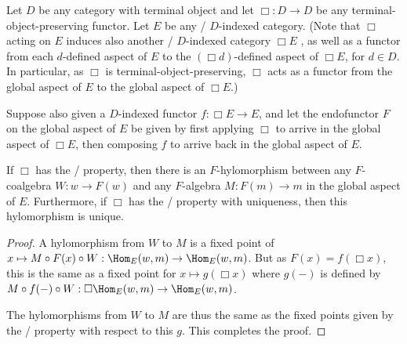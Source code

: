 \begin{theorem}\label{CoalgToAlg}
Let $D$ be any category with terminal object and let $\Box : D \to D$ be any terminal-object-preserving functor. Let $E$ be any \repsmall/ $D$-indexed category. (Note that $\Box$ acting on $E$ induces also another \repsmall/ $D$-indexed category $\Box E$ , as well as a functor from each $d$-defined aspect of $E$ to the $(\Box d)$-defined aspect of $\Box E$, for $d \in D$. In particular, as $\Box$ is terminal-object-preserving, $\Box$ acts as a functor from the global aspect of $E$ to the global aspect of $\Box E$.) 

Suppose also given a $D$-indexed functor $f : \Box E \to E$, and let the endofunctor $F$ on the global aspect of $E$ be given by first applying $\Box$ to arrive in the global aspect of $\Box E$, then composing $f$ to arrive back in the global aspect of $E$.

If $\Box$ has the \Loeb/ property, then there is an $F$-hylomorphism between any $F$-coalgebra $W : w \to F(w)$ and any $F$-algebra $M : F(m) \to m$ in the global aspect of $E$. Furthermore, if $\Box$ has the \Loeb/ property with uniqueness, then this hylomorphism is unique.
\end{theorem}
\begin{proof}
A hylomorphism from $W$ to $M$ is a fixed point of $x \mapsto M \circ F(x) \circ W : \Hom_E(w, m) \to \Hom_E(w, m)$. But as $F(x) = f(\Box x)$, this is the same as a fixed point for $x \mapsto g(\Box x)$ where $g(-)$ is defined by $M \circ f(-) \circ W : \Box \Hom_E(w, m) \to \Hom_E(w, m)$. 

The hylomorphisms from $W$ to $M$ are thus the same as the fixed points given by the \Loeb/ property with respect to this $g$. This completes the proof.
\end{proof}

